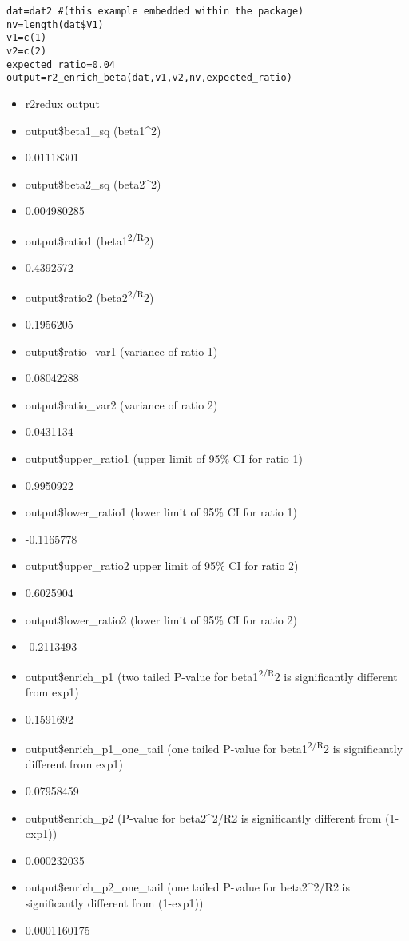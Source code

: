 \documentclass[
]{article}
\providecommand{\tightlist}{%
  \setlength{\itemsep}{0pt}\setlength{\parskip}{0pt}}
\begin{document}
\begin{verbatim}
dat=dat2 #(this example embedded within the package)
nv=length(dat$V1)
v1=c(1)
v2=c(2)
expected_ratio=0.04
output=r2_enrich_beta(dat,v1,v2,nv,expected_ratio)
\end{verbatim}

\begin{itemize}
\tightlist
\item
  r2redux output
\item
  output\$beta1\_sq (beta1\^{}2)
\item
  0.01118301
\item
  output\$beta2\_sq (beta2\^{}2)
\item
  0.004980285
\item
  output\$ratio1 (beta1\textsuperscript{2/R}2)
\item
  0.4392572
\item
  output\$ratio2 (beta2\textsuperscript{2/R}2)
\item
  0.1956205
\item
  output\$ratio\_var1 (variance of ratio 1)
\item
  0.08042288
\item
  output\$ratio\_var2 (variance of ratio 2)
\item
  0.0431134
\item
  output\$upper\_ratio1 (upper limit of 95\% CI for ratio 1)
\item
  0.9950922
\item
  output\$lower\_ratio1 (lower limit of 95\% CI for ratio 1)
\item
  -0.1165778
\item
  output\$upper\_ratio2 upper limit of 95\% CI for ratio 2)
\item
  0.6025904
\item
  output\$lower\_ratio2 (lower limit of 95\% CI for ratio 2)
\item
  -0.2113493
\item
  output\$enrich\_p1 (two tailed P-value for beta1\textsuperscript{2/R}2
  is significantly different from exp1)
\item
  0.1591692
\item
  output\$enrich\_p1\_one\_tail (one tailed P-value for
  beta1\textsuperscript{2/R}2 is significantly different from exp1)
\item
  0.07958459
\item
  output\$enrich\_p2 (P-value for beta2\^{}2/R2 is significantly
  different from (1-exp1))
\item
  0.000232035
\item
  output\$enrich\_p2\_one\_tail (one tailed P-value for beta2\^{}2/R2 is
  significantly different from (1-exp1))
\item
  0.0001160175
\end{itemize}
\end{document}
